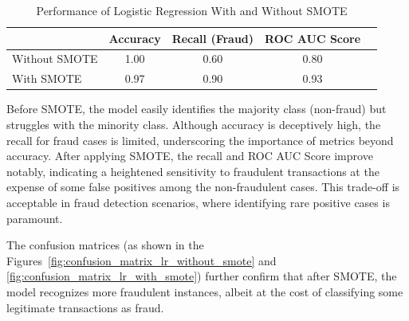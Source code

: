 \documentclass[11pt, oneside]{article}   	%
\begin{document}
\begin{table}[H]
\centering
\caption{Performance of Logistic Regression With and Without SMOTE}
\label{tab:lr_smote}
\begin{tabular}{lcccc}
\hline
 & Accuracy & Recall (Fraud) & ROC AUC Score\\
\hline
Without SMOTE & 1.00 & 0.60 & 0.80 \\
With SMOTE    & 0.97 & 0.90 & 0.93 \\
\hline
\end{tabular}
\end{table}

Before SMOTE, the model easily identifies the majority class (non-fraud) but struggles with the minority class. Although accuracy is deceptively high, the recall for fraud cases is limited, underscoring the importance of metrics beyond accuracy. After applying SMOTE, the recall and ROC AUC Score improve notably, indicating a heightened sensitivity to fraudulent transactions at the expense of some false positives among the non-fraudulent cases. This trade-off is acceptable in fraud detection scenarios, where identifying rare positive cases is paramount.

The confusion matrices (as shown in the Figures~\ref{fig:confusion_matrix_lr_without_smote} and \ref{fig:confusion_matrix_lr_with_smote}) further confirm that after SMOTE, the model recognizes more fraudulent instances, albeit at the cost of classifying some legitimate transactions as fraud.
\end{document}

